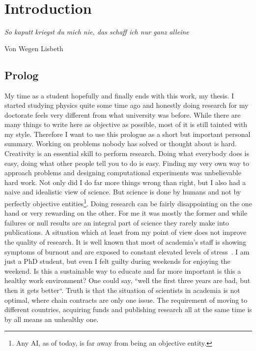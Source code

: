 \chapter{Introduction}
\label{chapter:intro}
\epigraph{\textit{So kaputt kriegst du mich nie, das schaff ich nur ganz alleine}}{Von Wegen Lisbeth}

\section{Prolog}
\label{sec:prolog}
My time as a student hopefully and finally ends with this work, my thesis.
I started studying physics quite some time ago and honestly doing research for my doctorate feels very different from what university was before.
While there are many things to write here as objective as possible, most of it is still tainted with my style.
Therefore I want to use this prologue as a short but important personal summary.
Working on problems nobody has solved or thought about is hard.
Creativity is an essential skill to perform research.
Doing what everybody does is easy, doing what other people tell you to do is easy.
Finding my very own way to approach problems and designing computational experiments was unbelievable hard work. 
Not only did I do far more things wrong than right, but I also had a naive and idealistic view of science.
But science is done by humans and not by perfectly objective entities\footnote{Any AI, as of today, is far away from being an objective entity.}.
Doing research can be fairly disappointing on the one hand or very rewarding on the other.
For me it was mostly the former and while failures or null results are an integral part of science they rarely make into publications.
A situation which at least from my point of view does not improve the quality of research.
It is well known that most of academia's staff is showing symptoms of burnout and are exposed to constant elevated levels of stress~\cite{gewin2021pandemic, bilge2006examining, henny2014prevalence, watts2011burnout, satinsky2021systematic}.
I am just a PhD student, but even I felt guilty during weekends for enjoying the weekend.
Is this a sustainable way to educate and far more important is this a healthy work environment?
One could say, ``well the first three years are bad, but then it gets better``. 
Truth is that the situation of scientists in academia is not optimal, where chain contracts are only one issue.
The requirement of moving to different countries, acquiring funds and publishing research all at the same time is by all means an unhealthy one.


